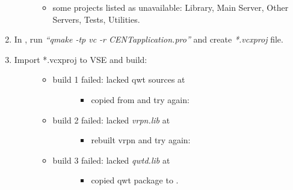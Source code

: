 \documentclass[letterpaper,10pt,english]{sphinxmanual}
\begin{document}
\begin{enumerate}
\begin{description}
\begin{itemize}
\item {} 
some projects listed as unavailable: Library, Main Server, Other Servers, Tests, Utilities.

\end{itemize}

\end{description}

\item {} 
In , run \emph{``qmake -tp vc -r CENTapplication.pro''} and create \emph{*.vcxproj} file.

\item {} \begin{description}
\item[{Import *.vcxproj to VSE and build:}] \leavevmode\begin{itemize}
\item {} \begin{description}
\item[{build 1 failed: lacked qwt sources at }] \leavevmode\begin{itemize}
\item {} 
copied from  and try again:

\end{itemize}

\end{description}

\item {} \begin{description}
\item[{build 2 failed: lacked \emph{vrpn.lib} at }] \leavevmode\begin{itemize}
\item {} 
rebuilt vrpn and try again:

\end{itemize}

\end{description}

\item {} \begin{description}
\item[{build 3 failed: lacked \emph{qwtd.lib} at }] \leavevmode\begin{itemize}
\item {} 
copied qwt package to .


\end{itemize}
\end{description}
\end{itemize}
\end{description}
\end{enumerate}
\end{document}
